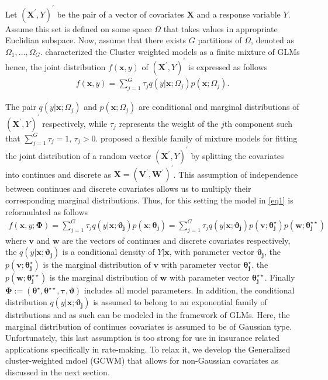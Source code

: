 \documentclass[11pt,letterpaper]{article}
\numberwithin{equation}{section}
\numberwithin{equation}{section}
\numberwithin{equation}{section}
\begin{document}
Let $(\bm{X^{'}}, Y)^{'}$  be the pair of a vector of covariates  $\bm{X}$ and a response variable $Y$. Assume this set is defined on some space $\Omega$ that takes values in appropriate Euclidian subspace. Now, assume that there exists $G$ partitions of $\Omega$, denoted as $\Omega_1, \ldots, \Omega_G$.  \cite{Gershenfeld:1997} characterized the Cluster weighted models as a finite mixture of GLMs hence, the joint distribution $f(\bm x, y)$ of $(\bm{X^{'}}, Y )^{'}$  is expressed as follows
 \begin{align}
 f(\bm x, y)= \sum_{j=1}^{G} \tau_j q(y|\bm{x};\Omega_j)p(\bm{x};\Omega_j).
\label{eq1}
\end{align}

The pair $q(y|\bm{x};\Omega_j)$ and $p(\bm{x};\Omega_j)$ are conditional and marginal distributions of $(\bm{X^{'}}, Y)^{'}$ respectively, while $\tau_j$ represents the weight of the $j$th component such that $\sum_{j=1}^{G}\tau_j=1$, $\tau_j>0$.
\cite{Ingrassia+Punzo+Vittadini+Minotti:2015} proposed a flexible family of mixture models for fitting the joint distribution of a random vector $(\bm{X^{'}}, Y)^{'}$ by splitting the covariates into continues and discrete as $ \bm{X}=(\bm{V^{'}},  \bm{W^{'}})^{'}$. This assumption of independence between continues and discrete covariates allows us to multiply their corresponding marginal distributions. Thus, for this setting the model in \eqref{eq1} is reformulated as follows
\begin{align}
 f(\bm x, y; \bm{\Phi})= \sum_{j=1}^{G} \tau_j q(y|\bm{x};\bm{\vartheta_j})p(\bm{x};\bm{\theta_j})=\sum_{j=1}^{G} \tau_j q(y|\bm{x};\bm{\vartheta_j})p(\bm{v}; \bm{\theta_j^{\star}})p(\bm{w};\bm{\theta_j^{\star\star}})
\label{eq2}
\end{align}
where $\bm{v}$ and $\bm{w}$ are the vectors of continues and discrete covariates respectively, the $q(y|\bm{x};\bm{\vartheta_j})$ is a conditional density of $Y|\bm{x}$, with parameter vector $\bm{\vartheta_j}$, the $p(\bm{v};\bm{\theta_j^{\star}})$ is the marginal distribution of $\bm{v}$ with parameter vector $\bm{\theta_j^{\star}}$. the $p(\bm{w};\bm{\theta_j^{\star\star}})$ is the marginal distribution of $\bm{w}$ with parameter vector $\bm{\theta_j^{\star\star}}$. Finally $\bm{\Phi}:=(\bm{\theta^{\star}},\bm{\theta^{\star\star}}, \bm{\tau}, \bm{\vartheta})$ includes all model parameters. %
In addition, the conditional distribution $q(y|\bm{x};\bm{\vartheta_j})$ is assumed to belong to an exponential family of distributions and as such can be modeled in the framework of GLMs. Here, the marginal distribution of continues covariates is assumed to be of Gaussian type. Unfortunately, this last assumption is too strong for use in insurance related applications specifically in rate-making. To relax it, we develop the Generalized cluster-weighted mdoel (GCWM) that allows for non-Gaussian covariates as discussed in the next section.
\end{document}
